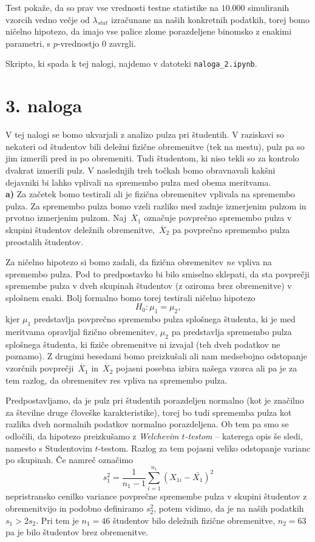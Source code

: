 \documentclass[a4paper,11pt]{article}
\newcommand{\olsi}[1]{\,\overline{\!{#1}}} %
\begin{document}
Test pokaže, da so prav vse vrednosti testne statistike na $10.000$ simuliranih vzorcih vedno večje od $\lambda_{stat}$ izračunane na naših konkretnih podatkih, torej bomo ničelno hipotezo, da imajo vse palice zlome porazdeljene binomsko z enakimi parametri, s $p$-vrednostjo $0$ zavrgli.

Skripto, ki spada k tej nalogi, najdemo v datoteki \texttt{naloga\_2.ipynb}.

\section*{3. naloga}

V tej nalogi se bomo ukvarjali z analizo pulza pri študentih. V raziskavi so nekateri od študentov bili deležni fizične obremenitve (tek na mestu), pulz pa so jim izmerili pred in po obremeniti. Tudi študentom, ki niso tekli so za kontrolo dvakrat izmerili pulz. V naslednjih treh točkah bomo obravnavali kakšni dejavniki bi lahko vplivali na spremembo pulza med obema meritvama.
\\

\noindent
\textbf{a)} Za začetek bomo testirali ali je fizična obremenitev vplivala na spremembo pulza. Za spremembo pulza bomo vzeli razliko med zadnje izmerjenim pulzom in prvotno izmerjenim pulzom. Naj $\olsi{X}_1$ označuje povprečno spremembo pulza v skupini študentov deležnih obremenitve, $\olsi{X}_2$ pa povprečno spremembo pulza preostalih študentov. 

Za ničelno hipotezo si bomo zadali, da fizična obremenitev \emph{ne} vpliva na spremembo pulza. Pod to predpostavko bi bilo smiselno sklepati, da sta povprečji spremembe pulza v dveh skupinah študentov (z oziroma brez obremenitve) v splošnem enaki. Bolj formalno bomo torej testirali ničelno hipotezo
\[
    H_0 : \mu_1 = \mu_2,
\]
kjer $\mu_1$ predstavlja povprečno spremembo pulza splošnega študenta, ki je med meritvama opravljal fizično obremenitev, $\mu_2$ pa predstavlja spremembo pulza splošnega študenta, ki fiziče obremenitve ni izvajal (teh dveh podatkov ne poznamo). Z drugimi besedami bomo preizkušali ali nam medsebojno odstopanje vzorčnih povprečji $\olsi{X}_1$ in $\olsi{X}_2$ pojasni posebna izbira našega vzorca ali pa je za tem razlog, da obremenitev res vpliva na spremembo pulza. 

Predpostavljamo, da je pulz pri študentih porazdeljen normalno (kot je značilno za številne druge človeške karakteristike), torej bo tudi sprememba pulza kot razlika dveh normalnih podatkov normalno porazdeljena. Ob tem pa smo se odločili, da hipotezo preizkušamo z \emph{Welchevim $t$-testom} -- katerega opis še sledi, namesto s Studentovim $t$-testom. 
Razlog za tem pojasni veliko odstopanje varianc po skupinah. Če namreč označimo
\[
    s_1^2 = \frac{1}{n_1 - 1}\sum_{i = 1}^{n_1} (X_{1i} - \bar{X_1})^2
\]
nepristransko cenilko variance povprečne spremembe pulza v skupini študentov z obremenitvijo in podobno definiramo $s_2^2$, potem vidimo, da je na naših podatkih $s_1 > 2s_2$. Pri tem je $n_1 = 46$ študentov bilo deležnih fizične obremenitve, $n_2 = 63$ pa je bilo študentov brez obremenitve. 
\end{document}
